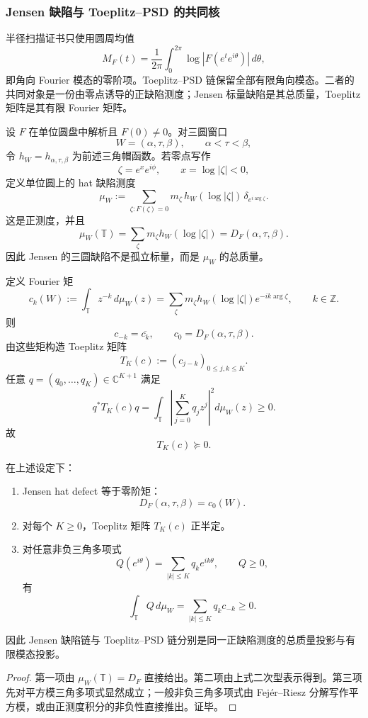 \subsubsection{Jensen 缺陷与 Toeplitz--PSD 的共同核}\label{subsubsec:typed-address-biaxial-completion-jensen-toeplitz-fusion-common-kernel}
半径扫描证书只使用圆周均值
\[
M_F(t)=
\frac1{2\pi}
\int_0^{2\pi}\log|F(e^te^{i\theta})|\,d\theta,
\]
即角向 Fourier 模态的零阶项。Toeplitz--PSD 链保留全部有限角向模态。二者的共同对象是一份由零点诱导的正缺陷测度；Jensen 标量缺陷是其总质量，Toeplitz 矩阵是其有限 Fourier 矩阵。

设 \(F\) 在单位圆盘中解析且 \(F(0)\ne0\)。对三圆窗口
\[
W=(\alpha,\tau,\beta),
\qquad
\alpha<\tau<\beta,
\]
令 \(h_W=h_{\alpha,\tau,\beta}\) 为前述三角帽函数。若零点写作
\[
\zeta=e^x e^{i\phi},
\qquad
x=\log|\zeta|<0,
\]
定义单位圆上的 hat 缺陷测度
\[
\mu_W
:=
\sum_{\zeta:F(\zeta)=0}
m_\zeta\,h_W(\log|\zeta|)\,
\delta_{e^{i\arg\zeta}}.
\]
这是正测度，并且
\[
\mu_W(\mathbb T)
=
\sum_\zeta m_\zeta h_W(\log|\zeta|)
=
D_F(\alpha,\tau,\beta).
\]
因此 Jensen 的三圆缺陷不是孤立标量，而是 \(\mu_W\) 的总质量。

定义 Fourier 矩
\[
c_k(W)
:=
\int_{\mathbb T}z^{-k}\,d\mu_W(z)
=
\sum_\zeta
m_\zeta h_W(\log|\zeta|)
e^{-ik\arg\zeta},
\qquad
k\in\mathbb Z.
\]
则
\[
c_{-k}=\overline{c_k},
\qquad
c_0=D_F(\alpha,\tau,\beta).
\]
由这些矩构造 Toeplitz 矩阵
\[
T_K(c):=(c_{j-k})_{0\le j,k\le K}.
\]
任意 \(q=(q_0,\ldots,q_K)\in\mathbb C^{K+1}\) 满足
\[
q^*T_K(c)q
=
\int_{\mathbb T}
\left|\sum_{j=0}^Kq_jz^j\right|^2d\mu_W(z)
\ge0.
\]
故
\[
T_K(c)\succeq0.
\]

\begin{theorem}\label{thm:typed-address-biaxial-completion-jensen-toeplitz-common-kernel}
在上述设定下：
\begin{enumerate}
  \item Jensen hat defect 等于零阶矩：
  \[
  D_F(\alpha,\tau,\beta)=c_0(W).
  \]
  \item 对每个 \(K\ge0\)，Toeplitz 矩阵 \(T_K(c)\) 正半定。
  \item 对任意非负三角多项式
  \[
  Q(e^{i\theta})=\sum_{|k|\le K}q_ke^{ik\theta},
  \qquad
  Q\ge0,
  \]
  有
  \[
  \int_{\mathbb T}Q\,d\mu_W
  =
  \sum_{|k|\le K}q_kc_{-k}
  \ge0.
  \]
\end{enumerate}
因此 Jensen 缺陷链与 Toeplitz--PSD 链分别是同一正缺陷测度的总质量投影与有限模态投影。
\end{theorem}
\begin{proof}
第一项由 \(\mu_W(\mathbb T)=D_F\) 直接给出。第二项由上式二次型表示得到。第三项先对平方模三角多项式显然成立；一般非负三角多项式由 Fej\'er--Riesz 分解写作平方模，或由正测度积分的非负性直接推出。证毕。
\end{proof}

